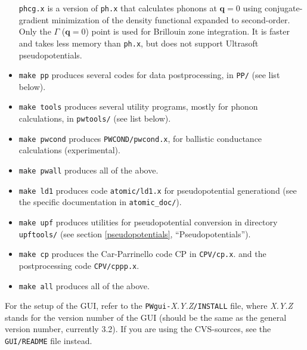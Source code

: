 \documentclass[12pt,a4paper]{article}
\def\version{3.2}
\begin{document}
\begin{itemize}
    \texttt{phcg.x} is a version of \texttt{ph.x} that calculates
    phonons at $\mathbf{q}=0$ using conjugate-gradient minimization of
    the density functional expanded to second-order.
    Only the $\Gamma$ ($\mathbf{q}=0$) point is used for Brillouin
    zone integration.
    It is faster and takes less memory than \texttt{ph.x}, but does
    not support Ultrasoft pseudopotentials.
%
  \item
    \texttt{make pp} produces several codes for data postprocessing, in
    \texttt{PP/} (see list below).
  \item
    \texttt{make tools} produces several utility programs, mostly for
    phonon calculations, in \texttt{pwtools/} (see list below).
  \item
    \texttt{make pwcond} produces \texttt{PWCOND/pwcond.x}, for
    ballistic conductance calculations (experimental).
  \item
    \texttt{make pwall} produces all of the above.
  \item
    \texttt{make ld1} produces code \texttt{atomic/ld1.x} for 
    pseudopotential generationd (see the specific
    documentation in \texttt{atomic\_doc/}).
  \item
    \texttt{make upf} produces utilities for pseudopotential
    conversion in directory \texttt{upftools/} (see section
    \ref{pseudopotentials}, ``Pseudopotentials'').
  \item
    \texttt{make cp} produces the Car-Parrinello code CP in
    \texttt{CPV/cp.x}. and the postprocessing code 
    \texttt{CPV/cppp.x}.
  \item
    \texttt{make all} produces all of the above.
\end{itemize}
For the setup of the GUI, refer to the
\texttt{PWgui-}\emph{X.Y.Z}\texttt{/INSTALL} file, where \emph{X.Y.Z}
stands for the version number of the GUI (should be the same as the
general version number, currently \version).
If you are using the CVS-sources, see the \texttt{GUI/README}
file instead.
\end{document}
